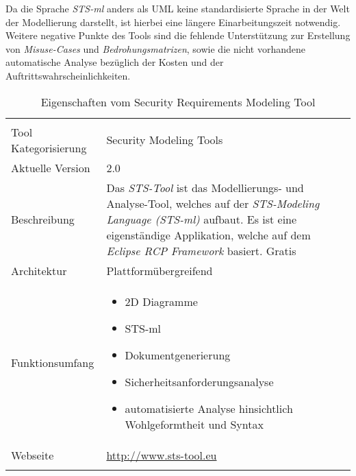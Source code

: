 Da die Sprache \textit{STS-ml} anders als UML keine standardisierte Sprache in der Welt der Modellierung darstellt, ist hierbei eine längere Einarbeitungszeit notwendig. Weitere negative Punkte des Tools sind die fehlende Unterstützung zur Erstellung von \textit{Misuse-Cases} und \textit{Bedrohungsmatrizen}, sowie die nicht vorhandene automatische Analyse bezüglich der Kosten und der Auftrittswahrscheinlichkeiten.

\begin{table}[htbp]
\renewcommand{\arraystretch}{1.5}
\caption{Eigenschaften vom  Security Requirements Modeling Tool}
\label{tab:sts}
\begin{tabularx}{\textwidth}{ l !{\color{white}\vrule}  X }
{}   					\\
\hline
{}Tool Kategorisierung 	& Security Modeling Tools	\\
\hline
{}Aktuelle Version  		& 2.0								\\
\hline
{}Beschreibung				&  Das \textit{STS-Tool} ist das Modellierungs- und Analyse-Tool, welches auf der \textit{STS-Modeling Language (STS-ml)} aufbaut. Es ist eine eigenständige Applikation, welche auf dem \textit{Eclipse RCP Framework} basiert. 		\linebreak \linebreak Gratis							\\
\hline
{}Architektur				& Plattformübergreifend \\
\hline
{}Funktionsumfang		& \begin{itemize}
										\item  2D Diagramme
										\item STS-ml 
										\item Dokumentgenerierung
										\item Sicherheitsanforderungsanalyse
										\item automatisierte Analyse hinsichtlich Wohlgeformtheit und Syntax
									\end{itemize}\\
\hline
{} Webseite		&		\url{http://www.sts-tool.eu} \\
\hline
\end{tabularx}
\end{table}

